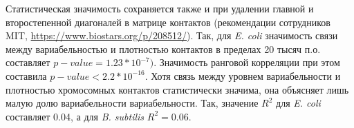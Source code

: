 Статистическая значимость сохраняется также и при удалении главной и второстепенной диагоналей в матрице контактов (рекомендации сотрудников MIT, \url{https://www.biostars.org/p/208512/}). Так, для \textit{E. coli} значимость связи между вариабельностью и плотностью контактов в пределах 20 тысяч п.о. составляет $p-value = 1.23*10^{-7})$. Значимость ранговой корреляции при этом составила $p-value < 2.2*10^{-16}$. 
Хотя связь между уровнем вариабельности и плотностью хромосомных контактов статистически значима, она объясняет лишь малую долю вариабельности вариабельности. Так, значение $R^2$ для \textit{E. coli} составляет 0.04, а для \textit{B. subtilis} $R^2 = 0.06$.






